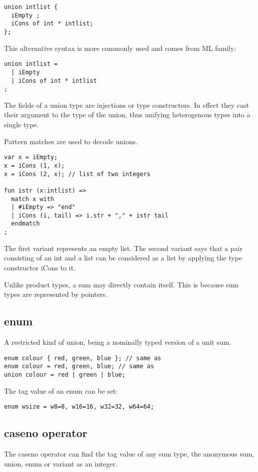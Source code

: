 \documentclass[oneside]{book}
\begin{document}
\begin{verbatim}
union intlist {
  iEmpty ;
  iCons of int * intlist;
};
\end{verbatim}


This alternative syntax is more commonly used
and comes from ML family:

\begin{verbatim}
union intlist = 
  | iEmpty 
  | iCons of int * intlist
;
\end{verbatim}


The fields of a union type are injections or type constructors.
In effect they cast their argument to the type of the union, thus
unifying heterogenous types into a single type.

Pattern matches are used to decode unions.

\begin{verbatim}
var x = iEmpty;
x = iCons (1, x);
x = iCons (2, x); // list of two integers

fun istr (x:intlist) =>
  match x with
  | #iEmpty => "end"
  | iCons (i, tail) => i.str + "," + istr tail
  endmatch
;
\end{verbatim}


The first variant represents an empty list. The second variant
says that a pair consisting of an int and a list can be considered
as a list by applying the type constructor iCons to it.

Unlike product types, a sum may directly contain itself.
This is because sum types are represented by pointers.

\subsection{enum}
A restricted kind of union, being a nominally typed version
of a unit sum.

\begin{verbatim}
enum colour { red, green, blue }; // same as
enum colour = red, green, blue; // same as
union colour = red | green | blue;
\end{verbatim}


The tag value of an enum can be set:

\begin{verbatim}
enum wsize = w8=8, w16=16, w32=32, w64=64;
\end{verbatim}


\subsection{caseno operator}
The caseno operator can find the tag value of any sum type,
the anonymous sum, union, enum or variant as an integer.
\end{document}

